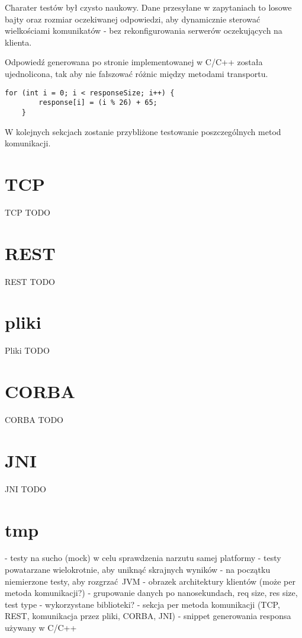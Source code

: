 Charater testów był czysto naukowy. Dane przesyłane w zapytaniach to losowe bajty oraz rozmiar oczekiwanej odpowiedzi, aby dynamicznie sterować wielkościami komunikatów - bez rekonfigurowania serwerów oczekujących na klienta.

Odpowiedź generowana po stronie implementowanej w C/C++ została ujednolicona, tak aby nie fałszować różnic między metodami transportu.

\begin{lstlisting}[caption={Fragment kodu wykorzystywanego w każdej metodzie komunikacji do generowania odpowiedzi},captionpos=b]
    for (int i = 0; i < responseSize; i++) {
        response[i] = (i % 26) + 65;
    }
\end{lstlisting}

W kolejnych sekcjach zostanie przybliżone testowanie poszczególnych metod komunikacji.

\section{TCP}

TCP TODO


\section{REST}

REST TODO


\section{pliki}

Pliki TODO


\section{CORBA}

CORBA TODO


\section{JNI}

JNI TODO


\section{tmp}

- testy na sucho (mock) w celu sprawdzenia narzutu samej platformy
- testy powatarzane wielokrotnie, aby uniknąć skrajnych wyników
- na początku niemierzone testy, aby rozgrzać JVM
- obrazek architektury klientów (może per metoda komunikacji?)
- grupowanie danych po nanosekundach, req size, res size, test type
- wykorzystane biblioteki?
- sekcja per metoda komunikacji (TCP, REST, komunikacja przez pliki, CORBA, JNI)
- snippet generowania responsa używany w C/C++
